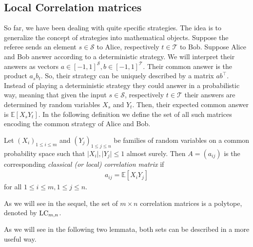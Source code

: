 \subsection{Local Correlation matrices}
So far, we have been dealing with quite specific strategies. The idea is to generalize the concept of strategies into mathematical objects. Suppose the referee sends an element $ s \in \mathcal{S} $ to Alice, respectively $ t \in\mathcal{T} $ to Bob. Suppose Alice and Bob answer according to a deterministic strategy. We will interpret their answers as vectors $ a \in [-1,1]^{\mathcal{S}}, b \in [-1,1]^{\mathcal{T}} $.  Their common answer is the product $ a_sb_t $. So, their strategy can be uniquely described by a  matrix $ ab^\top $.  Instead of playing a deterministic strategy they could answer in a probabilistic way, meaning that given the input $ s \in \mathcal{S} $, respectively $ t \in \mathcal{T} $ their answers are determined by random variables $ X_s $ and $ Y_t $. Then, their expected common answer is $ \mathbb{E}[X_sY_t] $. In the following definition we define the set of all such matrices encoding the common strategy of Alice and Bob.

\begin{dfn}
	Let $ (X_i)_{1 \le i \le m } $ and $ (Y_j)_{1 \le j \le n} $ be families of random variables on a common probability space such that $ \vert X_i \vert, \vert Y_j \vert \le 1 $ almost surely. Then $ A=(a_{ij}) $ is the corresponding {\itshape classical (or local) correlation matrix} if 
	\begin{align*}
		a_{ij} = \mathbb{E}[X_iY_j]
	\end{align*}
	for all $ 1 \le i \le m, 1 \le j \le n $.
\end{dfn}
As we will see in the sequel, the set of $ m \times n $ correlation matrices is a polytope, denoted by $ \textup{LC}_{m,n} $.

As we will see in the following two lemmata, both sets can be described in a more useful way. 

